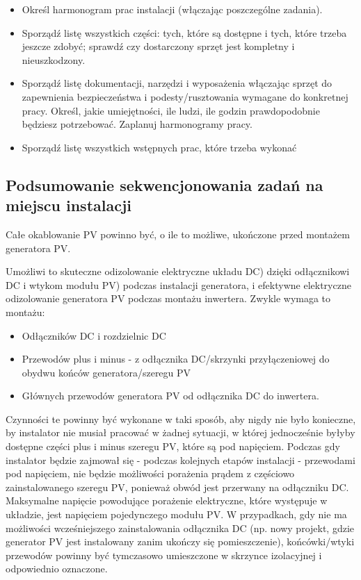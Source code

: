 \documentclass[12pt,a4paper]{article}
\begin{document}
\begin{itemize}
\item Określ harmonogram prac instalacji (włączając poszczególne 
zadania). 
\item Sporządź listę wszystkich części: tych, które są dostępne i tych, 
które trzeba jeszcze zdobyć; sprawdź czy dostarczony sprzęt jest 
kompletny i nieuszkodzony. 
\item Sporządź listę dokumentacji, narzędzi i wyposażenia włączając 
sprzęt do zapewnienia bezpieczeństwa i podesty/rusztowania wymagane do 
konkretnej pracy. Określ, jakie umiejętności, ile ludzi, ile godzin 
prawdopodobnie będziesz potrzebować. Zaplanuj harmonogramy pracy. 
\item Sporządź listę wszystkich wstępnych prac, które trzeba wykonać 
\end{itemize}
 

\subsection{Podsumowanie sekwencjonowania zadań na miejscu instalacji }

Całe okablowanie PV powinno być, o ile to możliwe, ukończone przed 
montażem generatora PV. 

Umożliwi to skuteczne odizolowanie elektryczne układu DC) dzięki 
odłącznikowi DC i wtykom modułu PV) podczas instalacji generatora, i 
efektywne elektryczne odizolowanie generatora PV podczas montażu 
inwertera. Zwykle wymaga to montażu: 

\begin{itemize}
\item Odłączników DC i rozdzielnic DC 
\item Przewodów plus i minus - z odłącznika DC/skrzynki przyłączeniowej 
do obydwu końców generatora/szeregu PV 
\item Głównych przewodów generatora PV od odłącznika DC do inwertera. 
\end{itemize}
Czynności te powinny być wykonane w taki sposób, aby nigdy nie było 
konieczne, by instalator nie musiał pracować w żadnej sytuacji, w której 
jednocześnie byłyby dostępne części plus i minus szeregu PV, które są 
pod napięciem. Podczas gdy instalator będzie zajmował się - podczas 
kolejnych etapów instalacji - przewodami pod napięciem, nie będzie 
możliwości porażenia prądem z częściowo zainstalowanego szeregu PV, 
ponieważ obwód jest przerwany na odłączniku DC. Maksymalne napięcie 
powodujące porażenie elektryczne, które występuje w układzie, jest 
napięciem pojedynczego modułu PV. W przypadkach, gdy nie ma możliwości 
wcześniejszego zainstalowania odłącznika DC (np. nowy projekt, gdzie 
generator PV jest instalowany zanim ukończy się pomieszczenie), 
końcówki/wtyki przewodów powinny być tymczasowo umieszczone w skrzynce 
izolacyjnej i odpowiednio oznaczone. 
\end{document}
